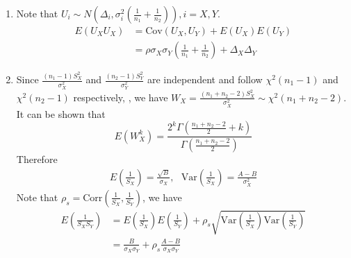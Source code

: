 \documentclass[12pt, a4paper]{article}
\newcommand{\cov}{\text{Cov}}
\newcommand{\cor}{\text{Corr}}
\newcommand{\var}{\text{Var}}
\begin{document}
	\begin{enumerate}
		\item Note that $U_i\sim N\left(\Delta_i, \sigma_i^2(\frac{1}{n_1} + \frac{1}{n_2})\right), i=X, Y$. 
		\begin{equation}\label{eq1}
			\begin{aligned}
				E(U_XU_X)&= \cov(U_X, U_Y) + E(U_X)E(U_Y) \\
				&= \rho\sigma_X\sigma_Y\left(\frac{1}{n_1} + \frac{1}{n_2}\right) +
				\Delta_X\Delta_Y
			\end{aligned} 
		\end{equation}
	
		\item Since $\frac{(n_1-1)S_{X}^2}{\sigma_X^2}$ and $\frac{(n_2-1)S_{Y}^2}{\sigma_Y^2}$ are
		independent and follow $\chi^2(n_1-1)$ and $\chi^2(n_2 -1)$ respectively, , we have $W_{X}=\frac{(n_1 + n_2 -2)S_X^2}{\sigma_X^2}\sim
		\chi^2(n_1 + n_2-2)$. It can be shown that 
		\[E(W_{X}^k)= \frac{2^k\Gamma(\frac{n_1 + n_2 -2}{2}+k)}{\Gamma(\frac{n_1 + n_2 -2}{2})}\] 
		Therefore 
		\begin{equation}
		\begin{aligned}
		E\left(\frac{1}{S_X}\right) =
	 \frac{\sqrt{B}}{\sigma_X},		~~~\var\left(\frac{1}{S_X}\right) = \frac{A-B}{\sigma_X^2}
		\end{aligned}
		\end{equation}
			Note that $\rho_s = \cor(\frac{1}{S_X}, \frac{1}{S_Y})$, we have 
			\begin{equation}\label{eq2}
			\begin{aligned}
			E(\frac{1}{S_XS_Y})  &= E(\frac{1}{S_X})E(\frac{1}{S_Y}) + \rho_s
			\sqrt{\var(\frac{1}{S_X})\var(\frac{1}{S_Y})} \\
			& = \frac{B}{\sigma_X\sigma_Y} + \rho_s
			\frac{A-B}{\sigma_X\sigma_Y}
			\end{aligned}
			\end{equation}
	

\end{enumerate}
\end{document}
